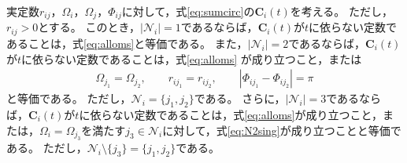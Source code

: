 \documentclass[tombow,dvipdfmx]{corona-a5-1.1}
\begin{document}
\begin{補題}[電力バランス方程式から導かれる母線の同期]
\label{lem:sumc2}
実定数$r_{ij}$，$\Omega_i$，$\Omega_j$，$\Phi_{ij}$に対して，式\ref{eq:sumcirc}の$\bm{C}_i (t)$を考える。
ただし，$r_{ij}>0$とする。
このとき，$|\mathcal{N}_i|=1$であるならば，$\bm{C}_i (t)$が$t$に依らない定数であることは，式\ref{eq:alloms}と等価である。
また，$|\mathcal{N}_i|=2$であるならば，$\bm{C}_i (t)$が$t$に依らない定数であることは，式\ref{eq:alloms}
が成り立つこと，または
\begin{align}\label{eq:N2sing}
\Omega_{j_1} = \Omega_{j_2}
,\qquad
r_{i j_1} = r_{i j_2}
,\qquad
|\Phi_{i j_1}-\Phi_{i j_2}| = \pi
\end{align}
と等価である。
ただし，$\mathcal{N}_i = \{j_1,j_2\}$である。
さらに，$|\mathcal{N}_i|=3$であるならば，$\bm{C}_i (t)$が$t$に依らない定数であることは，式\ref{eq:alloms}が成り立つこと，または，$\Omega_{i} = \Omega_{j_3}$を満たす$j_3 \in \mathcal{N}_i$に対して，式\ref{eq:N2sing}が成り立つことと等価である。
ただし，$ \mathcal{N}_i \setminus \{j_3\}=\{j_1,j_2\}$である。
\end{補題}
\end{document}
